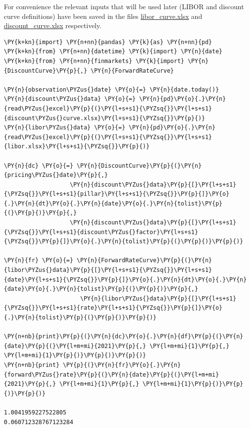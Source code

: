 For convenience the relevant inputs that will be used later (LIBOR and discount curve definitions) have been saved in the files \href{https://drive.google.com/file/d/1dm5oZnZKmJM6UrV0L32OcqD5Tzs9SI9A/view?usp=sharing}{libor\_curve.xlsx} and \href{https://drive.google.com/file/d/14R22r7m-6VpQ_P79D3qHdK0QN_mOQ_UB/view?usp=sharing}{discount\_curve.xlsx} respectively.

\begin{tcolorbox}[breakable, size=fbox, boxrule=1pt, pad at break*=1mm,colback=cellbackground, colframe=cellborder]
\begin{Verbatim}[commandchars=\\\{\}]
\PY{k+kn}{import} \PY{n+nn}{pandas} \PY{k}{as} \PY{n+nn}{pd}
\PY{k+kn}{from} \PY{n+nn}{datetime} \PY{k}{import} \PY{n}{date}
\PY{k+kn}{from} \PY{n+nn}{finmarkets} \PY{k}{import} \PY{n}{DiscountCurve}\PY{p}{,} \PY{n}{ForwardRateCurve}

\PY{n}{observation\PYZus{}date} \PY{o}{=} \PY{n}{date.today()}
\PY{n}{discount\PYZus{}data} \PY{o}{=} \PY{n}{pd}\PY{o}{.}\PY{n}{read\PYZus{}excel}\PY{p}{(}\PY{l+s+s1}{\PYZsq{}}\PY{l+s+s1}{discount\PYZus{}curve.xlsx}\PY{l+s+s1}{\PYZsq{}}\PY{p}{)}
\PY{n}{libor\PYZus{}data} \PY{o}{=} \PY{n}{pd}\PY{o}{.}\PY{n}{read\PYZus{}excel}\PY{p}{(}\PY{l+s+s1}{\PYZsq{}}\PY{l+s+s1}{libor.xlsx}\PY{l+s+s1}{\PYZsq{}}\PY{p}{)}

\PY{n}{dc} \PY{o}{=} \PY{n}{DiscountCurve}\PY{p}{(}\PY{n}{pricing\PYZus{}date}\PY{p}{,} 
                   \PY{n}{discount\PYZus{}data}\PY{p}{[}\PY{l+s+s1}{\PYZsq{}}\PY{l+s+s1}{pillar}\PY{l+s+s1}{\PYZsq{}}\PY{p}{]}\PY{o}{.}\PY{n}{dt}\PY{o}{.}\PY{n}{date}\PY{o}{.}\PY{n}{tolist}\PY{p}{(}\PY{p}{)}\PY{p}{,}
                   \PY{n}{discount\PYZus{}data}\PY{p}{[}\PY{l+s+s1}{\PYZsq{}}\PY{l+s+s1}{discount\PYZus{}factor}\PY{l+s+s1}{\PYZsq{}}\PY{p}{]}\PY{o}{.}\PY{n}{tolist}\PY{p}{(}\PY{p}{)}\PY{p}{)}

\PY{n}{fr} \PY{o}{=} \PY{n}{ForwardRateCurve}\PY{p}{(}\PY{n}{libor\PYZus{}data}\PY{p}{[}\PY{l+s+s1}{\PYZsq{}}\PY{l+s+s1}{date}\PY{l+s+s1}{\PYZsq{}}\PY{p}{]}\PY{o}{.}\PY{n}{dt}\PY{o}{.}\PY{n}{date}\PY{o}{.}\PY{n}{tolist}\PY{p}{(}\PY{p}{)}\PY{p}{,}
                      \PY{n}{libor\PYZus{}data}\PY{p}{[}\PY{l+s+s1}{\PYZsq{}}\PY{l+s+s1}{rate}\PY{l+s+s1}{\PYZsq{}}\PY{p}{]}\PY{o}{.}\PY{n}{tolist}\PY{p}{(}\PY{p}{)}\PY{p}{)}

\PY{n+nb}{print}\PY{p}{(}\PY{n}{dc}\PY{o}{.}\PY{n}{df}\PY{p}{(}\PY{n}{date}\PY{p}{(}\PY{l+m+mi}{2021}\PY{p}{,} \PY{l+m+mi}{1}\PY{p}{,} \PY{l+m+mi}{1}\PY{p}{)}\PY{p}{)}\PY{p}{)}
\PY{n+nb}{print} \PY{p}{(}\PY{n}{fr}\PY{o}{.}\PY{n}{forward\PYZus{}rate}\PY{p}{(}\PY{n}{date}\PY{p}{(}\PY{l+m+mi}{2021}\PY{p}{,} \PY{l+m+mi}{1}\PY{p}{,} \PY{l+m+mi}{1}\PY{p}{)}\PY{p}{)}\PY{p}{)}

1.0041959227522805
0.060712328767123284
\end{Verbatim}
\end{tcolorbox}

